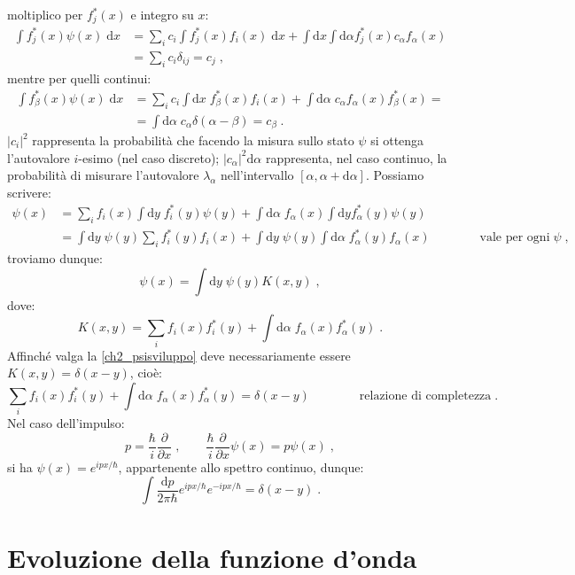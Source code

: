 \documentclass[10pt,a4paper]{report}
\theoremstyle{definition}
\numberwithin{equation}{section}
\newcommand{\diff}[1][]{\mathrm{d}#1}
\begin{document}
moltiplico per $f_j^*(x)$ e integro su $x$:
\begin{align*}
\int f_j^*(x)\psi(x)\;\diff{x}&= \sum_i c_i\int f_j^*(x)f_i(x)\;\diff{x}+\int\diff{x}\int\diff{\alpha}f_j^*(x)
c_\alpha f_{\alpha}(x) \\
&= \sum_i c_i\delta_{ij}= c_j\;,
\end{align*}
mentre per quelli continui:
\begin{align*}
\int f_{\beta}^*(x)\psi(x)\;\diff{x} &= \sum_i c_i\int\diff{x}\;f_{\beta}^*(x)f_i(x)+\int\diff{\alpha}\;c_{\alpha}f_{\alpha}(x)f_{\beta}^*(x)= \\
&= \int\diff{\alpha}\;c_{\alpha}\delta(\alpha-\beta)=c_{\beta}\;.
\end{align*}
$|c_i|^2$ rappresenta la probabilità che facendo la misura sullo stato $\psi$ si ottenga l'autovalore $i$-esimo (nel caso discreto); $|c_{\alpha}|^2\diff{\alpha}$ rappresenta, nel caso continuo, la probabilità di misurare l'autovalore $\lambda_{\alpha}$ nell'intervallo $[\alpha,\alpha+\diff{\alpha}]$. Possiamo scrivere:
\begin{align*}
\psi(x)&= \sum_i f_i(x)\int\diff{y}\;f_i^*(y)\psi(y)+\int\diff{\alpha}\;f_{\alpha}(x)\int\diff{y}f_{\alpha}^*(y)\psi(y) \\
&= \int\diff{y}\;\psi(y)\sum_i f_i^*(y)f_i(x)+\int\diff{y}\;\psi(y)\int\diff{\alpha}\;f_{\alpha}^*(y)f_{\alpha}(x) \qquad\qquad \mbox{vale per ogni}\; \psi\;,
\end{align*}
troviamo dunque:
\begin{equation}
\psi(x)=\int\diff{y}\;\psi(y)K(x,y)\;,
\end{equation}
dove:
$$
K(x,y)=\sum_i f_i(x)f_i^*(y)+\int\diff{\alpha}\;f_{\alpha}(x)f_{\alpha}^*(y)\;.
$$
Affinché valga la \eqref{ch2_psisviluppo} deve necessariamente essere $K(x,y)=\delta(x-y)$, cioè:
\begin{equation}
\sum_i f_i(x)f_i^*(y)+\int\diff{\alpha}\;f_{\alpha}(x)f_{\alpha}^*(y)=\delta(x-y)\qquad\qquad\mbox{relazione di completezza}\;.
\end{equation}
Nel caso dell'impulso:
$$
p=\frac{\hbar}{i}\frac{\partial}{\partial x}\;, \qquad \frac{\hbar}{i}\frac{\partial}{\partial x}\psi(x)=p\psi(x)\;,
$$
si ha $\psi(x)=e^{ipx/\hbar}$, appartenente allo spettro continuo, dunque:
\begin{equation}
\int\frac{\diff{p}}{2\pi\hbar}e^{ipx/\hbar}e^{-ipx/\hbar}=\delta(x-y)\;.
\end{equation}

\section{Evoluzione della funzione d'onda}
\end{document}
